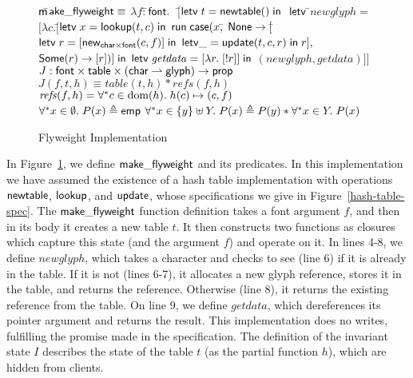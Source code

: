 \begin{figure}
\begin{specification}
\nextline $\mathsf{m}$\=$\mathsf{ake\_flyweight} \equiv$ 
\nextline            \> $\lambda f:$\=$\mathsf{font}.\;$
\nextline \> $[$\=$\mathsf{letv}\;t = \mathsf{newtable}()\;\mathsf{in}\;$ 
\nextline \> \> $\mathsf{letv\;}$\=$\mathit{newglyph} =$ 
\nextline \> \> \> \!\!$[\lambda c.[$\=$\mathsf{letv}\; x = \mathsf{lookup}(t, c)\;\mathsf{in}$
\nextline \> \>\>\> $\mathsf{run}\;\mathsf{case}(x,$\=
$\mathsf{None} \to [$\=$\mathsf{letv}\; r = [\mathsf{new}_{\mathsf{char} \times \mathsf{font}}(c,f)] \;\mathsf{in}$
\nextline \> \>\>\>\>\> $\mathsf{letv } \_ = \mathsf{update}(t, c, r) \;\mathsf{ in }\;r],$ 
\nextline \> \>\>\>\> $\mathsf{Some}(r) \to [r])] \;\mathsf{in}$ 
\nextline \> \> $\mathsf{letv\;}\mathit{getdata} = [\lambda r.\; [!r]] \;\mathsf{in}$ 
\nextline \> \> $(\mathit{newglyph}, \mathit{getdata})]]$
\\

\nextline $J : \mathsf{font} \times \mathsf{table} \times (\mathsf{char} \rightharpoonup \mathsf{glyph}) \to \mathsf{prop}$ 
\nextline $J(f, t, h) \equiv table(t,h) * \mathit{refs}(f, h)$ \\
\nextline $\mathit{refs}(f, h) = \forall^{*} c \in \mbox{dom}({h}).\; h(c) \mapsto (c, f)$  \\

\nextline $\forall^* x \in \emptyset.\; P(x) \triangleq \mathsf{emp} $ 
\nextline $\forall^* x \in \{{y}\} \uplus Y.\; P(x) \triangleq P(y) * \forall^* x \in Y.\; P(x)$
\end{specification}
\caption{Flyweight Implementation}
\label{flyweight-impl}
\end{figure}

In Figure~\ref{flyweight-impl}, we define $\mathsf{make\_flyweight}$
and its predicates. In this implementation we have assumed the
existence of a hash table implementation with operations
$\mathsf{newtable}$, $\mathsf{lookup}$, and $\mathsf{update}$, whose
specifications we give in Figure~\ref{hash-table-spec}. The
$\mathsf{make\_flyweight}$ function definition takes a font argument
$f$, and then in its body it creates a new table $t$. It then
constructs two functions as closures which capture this state (and the
argument $f$) and operate on it. In lines 4-8, we define $newglyph$,
which takes a character and checks to see (line 6) if it is already in
the table. If it is not (lines 6-7), it allocates a new glyph
reference, stores it in the table, and returns the
reference. Otherwise (line 8), it returns the existing reference from
the table.  On line 9, we define $\mathit{getdata}$, which dereferences its
pointer argument and returns the result. This implementation does no
writes, fulfilling the promise made in the specification. The
definition of the invariant state $I$ describes the state of the table
$t$ (as the partial function $h$), which are hidden from clients.

